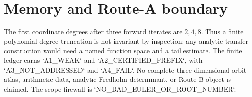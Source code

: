 \documentclass[10pt]{article}
\begin{document}
\section{Memory and Route-A boundary}
The first coordinate degrees after three forward iterates are $2,4,8$.
Thus a finite polynomial-degree truncation is not invariant by inspection;
any analytic transfer construction would need a named function space and a
tail estimate.  The finite ledger earns `A1\_WEAK` and
`A2\_CERTIFIED\_PREFIX`, with `A3\_NOT\_ADDRESSED` and `A4\_FAIL`.
No complete three-dimensional orbit atlas, arithmetic data, analytic Fredholm
determinant, or Route-B object is claimed.  The scope firewall is
`NO\_BAD\_EULER\_OR\_ROOT\_NUMBER`.
\end{document}
